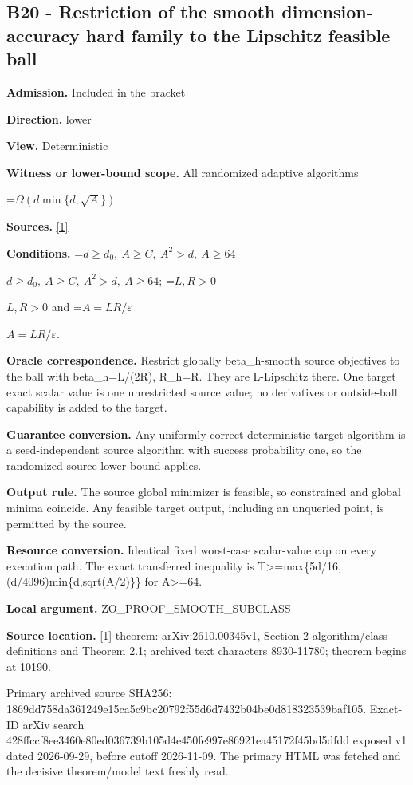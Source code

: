 \documentclass[10pt,a4paper]{article}
\newcommand{\AtlasMath}[1]{\par\begingroup\centering\setbox0=\hbox{$\displaystyle #1$}\ifdim\wd0>1.4\linewidth\typeout{ATLAS WIDE FORMULA: \the\wd0}\fi\ifdim\wd0>\linewidth\resizebox{\linewidth}{!}{\box0}\else\box0\fi\par\endgroup}
\newcommand{\AtlasInlineMath}[1]{\begingroup\setbox0=\hbox{$#1$}\ifdim\wd0>.4\linewidth\endgroup\AtlasMath{#1}\else\endgroup$#1$\fi}
\begin{document}
\subsection{B20 - Restriction of the smooth dimension-accuracy hard family to the Lipschitz feasible ball}
\textbf{Admission.} Included in the bracket

\textbf{Direction.} lower

\textbf{View.} Deterministic

\textbf{Witness or lower-bound scope.} All randomized adaptive algorithms

\AtlasMath{\Omega(d\min\{d,\sqrt A\})}
\textbf{Sources.} \href{https://arxiv.org/html/2610.00345v1}{[1]}

\textbf{Conditions.} \AtlasInlineMath{d\ge d_0,\ A\ge C,\ A^2>d,\ A\ge64}; \AtlasInlineMath{L,R>0} and \AtlasInlineMath{A=LR/\varepsilon}.

\textbf{Oracle correspondence.} Restrict globally beta\_\allowbreak{}h-smooth source objectives to the ball with beta\_\allowbreak{}h=L/(2R), R\_\allowbreak{}h=R. They are L-Lipschitz there. One target exact scalar value is one unrestricted source value; no derivatives or outside-ball capability is added to the target.

\textbf{Guarantee conversion.} Any uniformly correct deterministic target algorithm is a seed-independent source algorithm with success probability one, so the randomized source lower bound applies.

\textbf{Output rule.} The source global minimizer is feasible, so constrained and global minima coincide. Any feasible target output, including an unqueried point, is permitted by the source.

\textbf{Resource conversion.} Identical fixed worst-case scalar-value cap on every execution path. The exact transferred inequality is T>=max\{5d/16,(d/4096)min\{d,sqrt(A/2)\}\} for A>=64.

\textbf{Local argument.} ZO\_\allowbreak{}PROOF\_\allowbreak{}SMOOTH\_\allowbreak{}SUBCLASS

\textbf{Source location.} \href{https://arxiv.org/html/2610.00345v1}{[1]} theorem: arXiv:2610.00345v1, Section 2 algorithm/class definitions and Theorem 2.1; archived text characters 8930-11780; theorem begins at 10190.

Primary archived source SHA256: 1869dd758da361249e15ca5c9bc20792f55d6d7432b04be0d818323539baf105. Exact-ID arXiv search 428ffccf8ee3460e80ed036739b105d4e450fe997e86921ea45172f45bd5dfdd exposed v1 dated 2026-09-29, before cutoff 2026-11-09. The primary HTML was fetched and the decisive theorem/model text freshly read.
\end{document}
